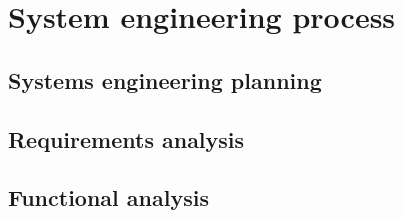 \chapter{System engineering process}

\section{Systems engineering planning}










\section{Requirements analysis}













\section{Functional analysis}

